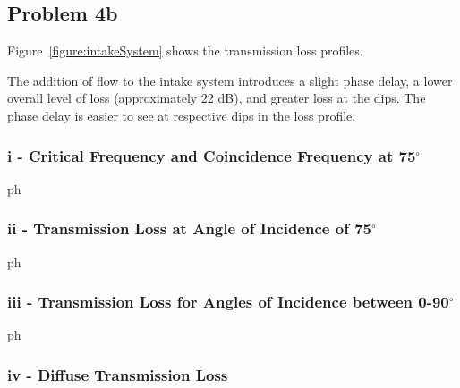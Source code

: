 {{\subsection*{Problem 4b}

\vspace{0.25cm}
Figure~\ref{figure:intakeSystem} shows the transmission loss profiles.


\vspace{0.25cm}
The addition of flow to the intake system introduces a slight phase delay, a lower overall level of loss (approximately 22 dB), and greater loss at the dips.  The phase delay is easier to see at respective dips in the loss profile.



\vspace{0.25cm}
\subsubsection*{i - Critical Frequency and Coincidence Frequency at 75$^\circ$}

ph



\vspace{0.25cm}
\subsubsection*{ii - Transmission Loss at Angle of Incidence of 75$^\circ$}

ph



\vspace{0.25cm}
\subsubsection*{iii - Transmission Loss for Angles of Incidence between 0-90$^\circ$}

ph



\vspace{0.25cm}
\subsubsection*{iv - Diffuse Transmission Loss}

}}
